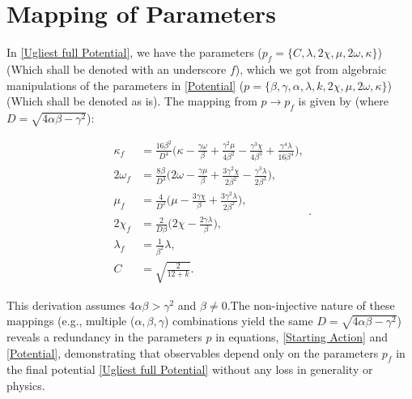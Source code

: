 \documentclass[aps,prd,reprint,preprintnumbers,showpacs,floatfix,nofootinbib,superscript address]{revtex4-2}
\begin{document}
\section{Mapping of Parameters} \label{Mapping of Parameters}
In \cref{Ugliest full Potential}, we have the parameters ($p_f = \{C,\lambda, 2\chi, \mu, 2\omega,  \kappa \}$) (Which shall be denoted with an underscore $f$), which we got from algebraic manipulations of the parameters in \cref{Potential} ($p = \{\beta,\gamma,\alpha,\lambda, k, 2\chi, \mu, 2\omega,  \kappa \}$) (Which shall be denoted as is). The mapping from $p \rightarrow p_f$ is given by (where $D = \sqrt{4\alpha \beta- \gamma^2}$):

\begin{subequations}
    \begin{align}
        \kappa_f &= \frac{16\beta^2}{D^4}\Big(\kappa - \frac{\gamma\omega}{\beta} + \frac{\gamma^2\mu}{4\beta^2} - \frac{\gamma^3\chi}{4\beta^3} +\frac{\gamma^4\lambda}{16\beta^4} \Big), \\
        2\omega_f &= \frac{8\beta}{D^3} \Big(2\omega - \frac{\gamma\mu}{\beta} + \frac{3\gamma^2\chi}{2\beta^2} - \frac{\gamma^3\lambda}{2\beta^3}\Big),    \\
        \mu_f &= \frac{4}{D^2} \Big(\mu - \frac{3\gamma\chi}{\beta} + \frac{3\gamma^2\lambda}{2\beta^2} \Big),  \\
        2\chi_f &= \frac{2}{D\beta} \Big(2\chi - \frac{2\gamma\lambda}{\beta}\Big),  \\
        \lambda_f &= \frac{1}{\beta^2}\lambda , \\
        C &= \sqrt{\frac{2}{12+k}}.
    \end{align}.    
\end{subequations}

This derivation assumes $4\alpha\beta > \gamma^2$ and $\beta \neq 0. $The non-injective nature of these mappings (e.g., multiple ($\alpha,\beta,\gamma$) combinations yield the same $D = \sqrt{4\alpha\beta - \gamma^2}$) reveals a redundancy in the parameters $p$ in equations, \cref{Starting Action} and \cref{Potential}, demonstrating that observables depend only on the parameters $p_f$ in the final potential \cref{Ugliest full Potential} without any loss in generality or physics. 
\end{document}
